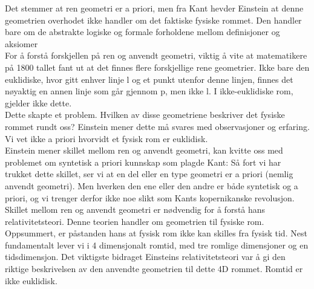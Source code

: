 \documentclass[11pt, a4paper]{article}
\begin{document}
Det stemmer at ren geometri er a priori, men fra Kant hevder Einstein at denne geometrien overhodet ikke handler om det faktiske fysiske rommet. Den handler bare om de abstrakte logiske og formale forholdene mellom definisjoner og aksiomer\\


For å forstå forskjellen på ren og anvendt geometri, viktig å vite at matematikere på 1800 tallet fant ut at det finnes flere forskjellige rene geometrier. Ikke bare den euklidiske, hvor gitt enhver linje l og et punkt utenfor denne linjen, finnes det nøyaktig en annen linje som går gjennom p, men ikke l. I ikke-euklidiske rom, gjelder ikke dette.\\

Dette skapte et problem. Hvilken av disse geometriene beskriver det fysiske rommet rundt oss? Einstein mener dette må svares med observasjoner og erfaring. Vi vet ikke a priori hvorvidt et fysisk rom er euklidisk.\\


Einstein mener skillet mellom ren og anvendt geometri, kan kvitte oss med problemet om syntetisk a priori kunnskap som plagde Kant: Så fort vi har trukket dette skillet, ser vi at en del eller en type geometri er a priori (nemlig anvendt geometri). Men hverken den ene eller den andre er både syntetisk og a priori, og vi trenger derfor ikke noe slikt som Kants kopernikanske revolusjon.\\



Skillet mellom ren og anvendt geometri er nødvendig for å forstå hans relativitetsteori. Denne teorien handler om geometrien til fysiske rom. Oppsummert, er påstanden hans at fysisk rom ikke kan skilles fra fysisk tid. Nest fundamentalt lever vi i 4 dimensjonalt romtid, med tre romlige dimensjoner og en tidsdimensjon. Det viktigste bidraget Einsteins relativitetsteori var å gi den riktige beskrivelsen av den anvendte geometrien til dette 4D rommet. Romtid er ikke euklidisk.
\end{document}
